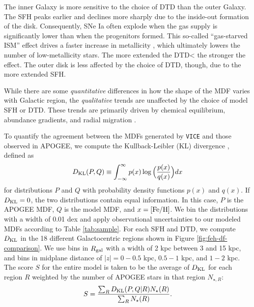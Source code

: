 \documentclass[twocolumn,twocolappendix,linenumbers,trackchanges]{aastex631}
\newcommand{\vice}{{\tt VICE}\xspace}
\begin{document}
The inner Galaxy is more sensitive to the choice of DTD than the outer Galaxy. The SFH peaks earlier and declines more sharply due to the inside-out formation of the disk. Consequently, SNe Ia often explode when the gas supply is significantly lower than when the progenitors formed. This so-called ``gas-starved ISM'' effect drives a faster increase in metallicity \citep[see analytic demonstration in][]{Weinberg2017-ChemicalEquilibrium}, which ultimately lowers the number of low-metallicity stars. The more extended the DTD< the stronger the effect. The outer disk is less affected by the choice of DTD, though, due to the more extended SFH.

While there are some {\it quantitative} differences in how the shape of the MDF varies with Galactic region, the {\it qualitative} trends are unaffected by the choice of model SFH or DTD. These trends are primarily driven by chemical equilibrium, abundance gradients, and radial migration .

To quantify the agreement between the MDFs generated by \vice and those observed in APOGEE, we compute the Kullback-Leibler (KL) divergence \citep{KullbackLeibler1951}, defined as
\begin{equation}
    D_{\rm{KL}}(P,Q) \equiv \int_{-\infty}^{\infty} p(x) \log\Big(\frac{p(x)}{q(x)}\Big) dx
    \label{eq:kl-divergence}
\end{equation}
for distributions $P$ and $Q$ with probability density functions $p(x)$ and $q(x)$. If $D_{\rm KL}=0$, the two distributions contain equal information. In this case, $P$ is the APOGEE MDF, $Q$ is the model MDF, and $x={\rm [Fe/H]}$. We bin the distributions with a width of 0.01 dex and apply observational uncertainties to our modeled MDFs according to Table \ref{tab:sample}. For each SFH and DTD, we compute $D_{\rm{KL}}$ in the 18 different Galactocentric regions shown in Figure \ref{fig:feh-df-comparison}. We use bins in $R_{\rm gal}$ with a width of 2 kpc between 3 and 15 kpc, and bins in midplane distance of $|z|=0-0.5$ kpc, $0.5-1$ kpc, and $1-2$ kpc. The score $S$ for the entire model is taken to be the average of $D_{\rm{KL}}$ for each region $R$ weighted by the number of APOGEE stars in that region $N_{\star,R}$:
\begin{equation}
    S = \frac{\sum_R D_{\rm KL}(P,Q|R) N_\star(R)}{\sum_R N_\star(R)}.
    \label{eq:feh-df-score}
\end{equation}
\end{document}
